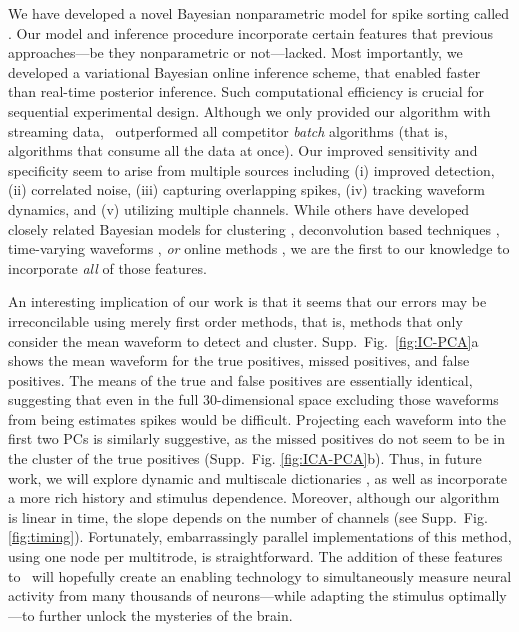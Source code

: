 
We have developed a novel Bayesian nonparametric model for spike sorting called \smug.  Our model and inference procedure incorporate certain features that previous approaches---be they nonparametric or not---lacked.  Most importantly, we developed a variational Bayesian online inference scheme, that enabled faster than real-time posterior inference.  Such computational efficiency is crucial for sequential experimental design.  Although we only provided our algorithm with streaming data, \smug\ outperformed all competitor \emph{batch} algorithms (that is, algorithms that consume all the data at once). Our improved sensitivity and specificity seem to arise from multiple sources including (i) improved detection, (ii) correlated noise, (iii) capturing overlapping spikes, (iv) tracking waveform dynamics, and (v) utilizing multiple channels.  While others have developed closely related Bayesian models for clustering \cite{WoodBla2008,wood2009}, deconvolution based techniques \cite{Pillow2013}, time-varying waveforms \cite{calabrese2011kalman},  \emph{or} online methods \cite{OSORT, Franke2010}, we are the first to our knowledge to incorporate \emph{all} of those features.

An interesting implication of our work is that it seems that our errors may be irreconcilable using merely first order methods, that is, methods that only consider the mean waveform to detect and cluster.  Supp.\ Fig.\ \ref{fig:IC-PCA}a shows the mean waveform for the true positives, missed positives, and false positives.  The means of the true and false positives are essentially identical, suggesting that even in the full 30-dimensional space excluding those waveforms from being estimates spikes would be difficult.  Projecting each waveform into the first two PCs is similarly suggestive, as the missed positives do not seem to be in the cluster of the true positives (Supp.\ Fig. \ref{fig:ICA-PCA}b). Thus, in future work, we will explore dynamic and multiscale dictionaries \cite{ChenMaggioni12}, as well as incorporate a more rich history and stimulus dependence.  
Moreover, although our algorithm is linear in time, the slope depends on the number of channels (see Supp.\ Fig. \ref{fig:timing}).  Fortunately, embarrassingly parallel implementations of this method, using one node per multitrode, is straightforward.  The addition of these features to \smug\ will hopefully create an enabling technology to  simultaneously measure neural activity from many thousands of neurons---while adapting the stimulus optimally---to further unlock the mysteries of the brain.






